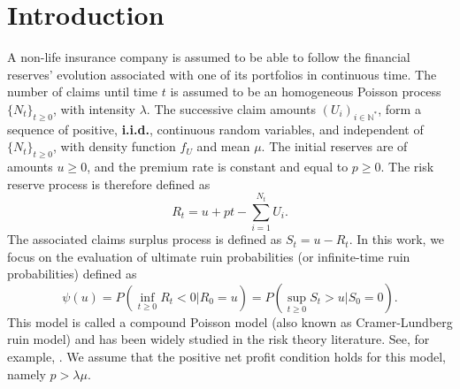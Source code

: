\section{Introduction}
A non-life insurance company is assumed to be able to follow the financial reserves\rq{} evolution associated with one of its portfolios in continuous time. The number of claims until time $t$ is assumed to be an homogeneous Poisson process $\{N_{t}\}_{t\geq0}$, with intensity $\lambda$. The successive claim amounts $(U_{i})_{i\in\mathbb{N}^{*}}$, form a sequence of positive, \textbf{i.i.d.}, continuous random variables, and independent of $\{N_{t}\}_{t\geq0}$, with density function $f_{U}$ and mean $\mu$. The initial reserves are of amounts $u\geq0$, and the premium rate is constant and equal to $p\geq0$. The risk reserve process is therefore defined as 
\[
R_{t}=u+pt-\sum_{i=1}^{N_{t}}U_{i}. 
\]
The associated claims surplus process is defined as $S_{t}=u-R_{t}$. In this work, we focus on the evaluation of ultimate ruin probabilities (or infinite-time ruin probabilities) defined as 
\begin{equation}\label{UltimateRuinProba}
\psi(u)=P\left(\inf_{t\geq0}R_{t}<0|R_{0}=u\right)=P\left(\sup_{t\geq0}S_{t}>u|S_{0}=0\right).
\end{equation}
This model is called a compound Poisson model (also known as Cramer-Lundberg ruin model) and has been widely studied in the risk theory literature. See, for example, \citet{RoScScTe99,AsAl10}. We assume that the positive net profit condition holds for this model, namely $p>\lambda\mu$.\\
